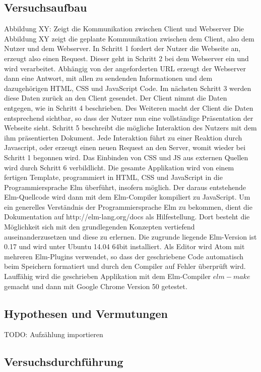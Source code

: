 \subsection{Versuchsaufbau}
\label{sec:Versuchsaufbau}
Abbildung XY: Zeigt die Kommunikation zwischen Client und Webserver
Die Abbildung XY zeigt die geplante Kommunikation zwischen dem Client, also dem Nutzer und dem Webserver.
In Schritt 1 fordert der Nutzer die Webseite an, erzeugt also einen Request. Dieser geht in Schritt 2 bei dem Webserver ein und wird verarbeitet. Abhängig von der angeforderten URL erzeugt der Webserver dann eine Antwort, mit allen zu sendenden Informationen und dem dazugehörigen HTML, CSS und JavaScript Code. Im nächsten Schritt 3 werden diese Daten zurück an den Client gesendet. Der Client nimmt die Daten entgegen, wie in Schritt 4 beschrieben. Des Weiteren macht der Client die Daten entsprechend sichtbar, so dass der Nutzer nun eine vollständige Präsentation der Webseite sieht. Schritt 5 beschreibt die mögliche Interaktion des Nutzers mit dem ihm präsentierten Dokument. Jede Interaktion führt zu einer Reaktion durch Javascript, oder erzeugt einen neuen Request an den Server, womit wieder bei Schritt 1 begonnen wird. Das Einbinden von CSS und JS aus externen Quellen wird durch Schritt 6 verbildlicht.
Die gesamte Applikation wird von einem fertigen Template, programmiert in HTML, CSS und JavaScript in die Programmiersprache Elm überführt, insofern möglich. Der daraus entstehende Elm-Quellcode wird dann mit dem Elm-Compiler kompiliert zu JavaScript.
Um ein generelles Verständnis der Programmiersprache Elm zu bekommen, dient die Dokumentation auf http://elm-lang.org/docs als Hilfestellung. Dort besteht die Möglichkeit sich mit den grundlegenden Konzepten vertiefend auseinanderzusetzen und diese zu erlernen.
Die zugrunde liegende Elm-Version ist 0.17 und wird unter Ubuntu 14.04 64bit installiert. Als Editor wird Atom mit mehreren Elm-Plugins verwendet, so dass der geschriebene Code automatisch beim Speichern formatiert und durch den Compiler auf Fehler überprüft wird.
Lauffähig wird die geschrieben Applikation mit dem Elm-Compiler $elm-make$ gemacht und dann mit Google Chrome Version 50 getestet.

\subsection{Hypothesen und Vermutungen}
\label{sec:Hypothesen und Vermutungen}
TODO: Aufzählung importieren

\subsection{Versuchsdurchführung}
\label{sec:Versuchsdurchführung}
